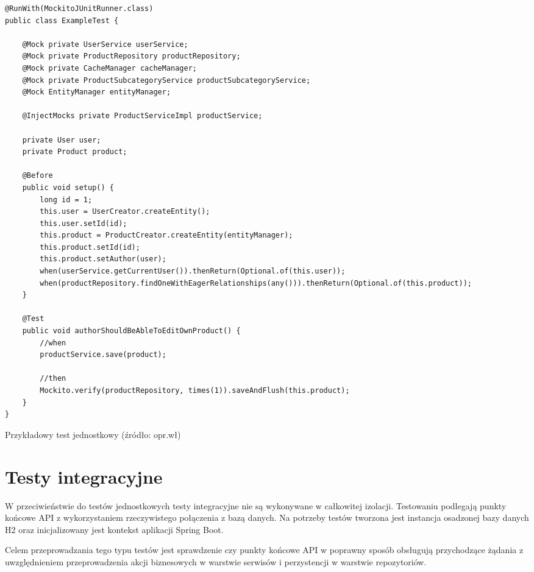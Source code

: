 \begin{listing}[h!]
    \begin{verbatim}
@RunWith(MockitoJUnitRunner.class)
public class ExampleTest {

    @Mock private UserService userService;
    @Mock private ProductRepository productRepository;
    @Mock private CacheManager cacheManager;
    @Mock private ProductSubcategoryService productSubcategoryService;
    @Mock EntityManager entityManager;

    @InjectMocks private ProductServiceImpl productService;

    private User user;
    private Product product;

    @Before
    public void setup() {
        long id = 1;
        this.user = UserCreator.createEntity();
        this.user.setId(id);
        this.product = ProductCreator.createEntity(entityManager);
        this.product.setId(id);
        this.product.setAuthor(user);
        when(userService.getCurrentUser()).thenReturn(Optional.of(this.user));
        when(productRepository.findOneWithEagerRelationships(any())).thenReturn(Optional.of(this.product));
    }

    @Test
    public void authorShouldBeAbleToEditOwnProduct() {
        //when
        productService.save(product);

        //then
        Mockito.verify(productRepository, times(1)).saveAndFlush(this.product);
    }
}
    \end{verbatim}
    \centering\caption{Przykładowy test jednostkowy (źródło: opr.wł)}\label{listing:javadoc}
\end{listing}


\section{Testy integracyjne}

W przeciwieństwie do testów jednostkowych testy integracyjne nie są wykonywane w całkowitej izolacji\cite{book:testy-jednostkowe}.
Testowaniu podlegają punkty końcowe API z wykorzystaniem rzeczywistego połączenia z bazą danych.
Na potrzeby testów tworzona jest instancja osadzonej bazy danych H2\cite{tech:h2-db} oraz inicjalizowany jest kontekst aplikacji Spring Boot.

\par
Celem przeprowadzania tego typu testów jest sprawdzenie czy punkty końcowe API w poprawny sposób obsługują przychodzące żądania
z uwzględnieniem przeprowadzenia akcji biznesowych w warstwie serwisów i perzystencji w warstwie repozytoriów.

